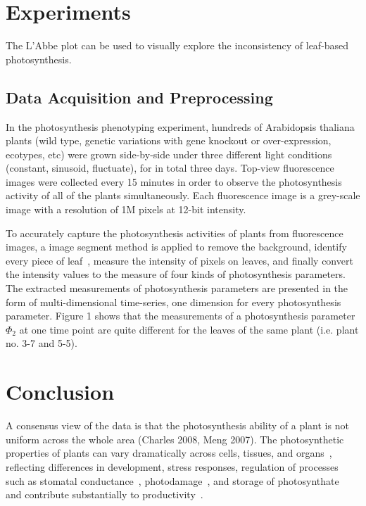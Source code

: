 \documentclass[times,11pt]{article}
\begin{document}
{\section{Experiments}

The L'Abbe plot can be used to visually explore the inconsistency of leaf-based photosynthesis.

\subsection{Data Acquisition and Preprocessing}

In the photosynthesis phenotyping experiment, hundreds of Arabidopsis thaliana plants (wild type, genetic variations with gene knockout or over-expression, ecotypes, etc) were grown side-by-side under three different light conditions (constant, sinusoid, fluctuate), for in total three days.
%
Top-view fluorescence images were collected every 15 minutes in order to observe the photosynthesis activity of all of the plants simultaneously. Each fluorescence image is a grey-scale image with a resolution of 1M pixels at 12-bit intensity.

To accurately capture the photosynthesis activities of plants from fluorescence images, a image segment method is applied to remove the background, identify every piece of leaf~\cite{yin2014}, measure the intensity of pixels on leaves, and finally convert the intensity values to the measure of four kinds of photosynthesis parameters.
%
The extracted measurements of photosynthesis parameters are presented in the form of multi-dimensional time-series, one dimension for every photosynthesis parameter.
%
Figure 1 shows that the measurements of a photosynthesis parameter $\Phi_2$ at one time point are quite different for the leaves of the same plant  (i.e. plant no. 3-7 and 5-5).

\section{Conclusion}

A consensus view of the data is that the photosynthesis ability of a plant is not uniform across the whole area (Charles 2008, Meng 2007).
%
The photosynthetic properties of plants can vary dramatically across cells, tissues, and organs~\cite{}, reflecting differences in development, stress responses, regulation of processes such as stomatal conductance~\cite{}, photodamage~\cite{}, and storage of photosynthate~\cite{} and contribute substantially to productivity~\cite{}.

}
\end{document}
